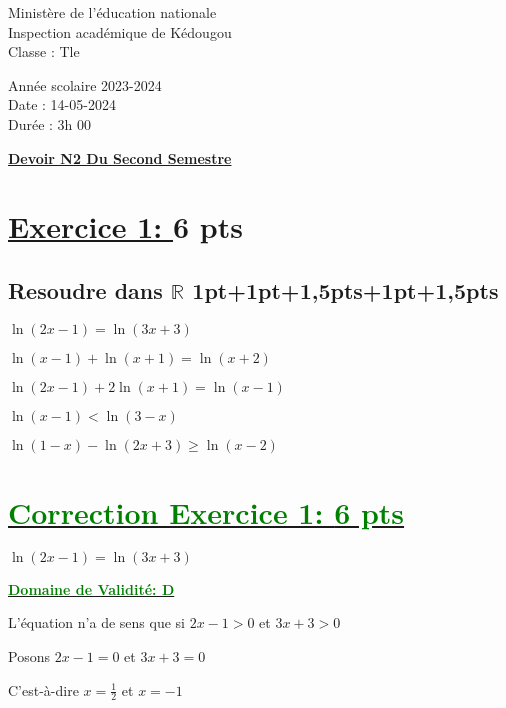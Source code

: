 \documentclass[12pt]{article}
\begin{document}
\begin{minipage}{0.5\textwidth}
	Ministère de l'éducation nationale  \\
	Inspection académique de Kédougou   \\
	Classe : Tle  \\
\end{minipage}
\begin{minipage}{0.5\textwidth}
	Année scolaire 2023-2024 \\
	Date : 14-05-2024 \\
	Durée : 3h 00 \\
\end{minipage}

\begin{center}
	\textbf{{\underline{Devoir N2 Du Second Semestre}}}
\end{center}
\section*{\underline{Exercice 1: }\textbf{6 pts}}
\subsection*{ Resoudre dans $\mathbb{R}$ 1pt+1pt+1,5pts+1pt+1,5pts}
$\ln(2x-1)=\ln(3x+3)$

$\ln(x-1)+\ln(x+1)=\ln(x+2)$

$\ln(2x-1)+2\ln(x+1)=\ln(x-1)$

$\ln(x-1)<\ln(3-x)$

$\ln(1-x)-\ln(2x+3)\geq\ln(x-2)$
\section*{\underline{\textcolor{green}{Correction Exercice 1: \textbf{6 pts}}}}
$\ln(2x-1)=\ln(3x+3)$

\textbf{\underline{\textcolor{green}{Domaine de Validité: D}}}

L'équation n'a de sens que si $2x-1>0$ et $3x+3>0$

Posons $2x-1=0$ et $3x+3=0$

C'est-à-dire $x=\frac{1}{2}$ et $x=-1$
\end{document}
